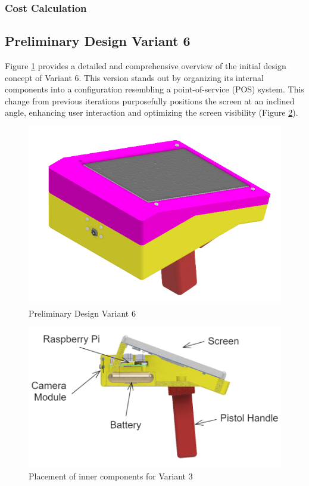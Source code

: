 \subsubsection{Cost Calculation}

\subsection{Preliminary Design Variant 6}
\label{subsec:preliminary_design_variant_6}
Figure \ref{fig:preliminary_design_variant_6} provides a detailed and comprehensive overview of the initial design concept of Variant 6. This version stands out by organizing its internal components into a configuration resembling a point-of-service (POS) system. This change from previous iterations purposefully positions the screen at an inclined angle, enhancing user interaction and optimizing the screen visibility (Figure \ref{fig:variant6_inner_components}).

\begin{figure}[h!]
    \centering
    \includegraphics[height=5 cm]{texs/Part1/chapter4/image/v61.png}
    \caption{Preliminary Design Variant 6}
    \label{fig:preliminary_design_variant_6}
\end{figure}

\begin{figure}[h!]
    \centering
    \includegraphics[height=5 cm]{texs/Part1/chapter4/image/v62.png}
    \caption{Placement of inner components for Variant 3}
    \label{fig:variant6_inner_components}
\end{figure}


